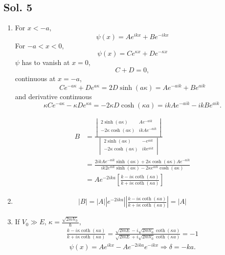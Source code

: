 \subsection*{Sol. 5}
\begin{enumerate}
    \item
          For $x<-a$,
          $$
              \psi(x) = Ae^{ik x} + Be^{-ikx}
          $$
          For $-a<x<0$,
          $$
              \psi(x) = Ce^{\kappa x}+De^{-\kappa x}
          $$
          $\psi$ has to vanish at $x=0$,
          $$
              C+D=0,
          $$
          continuous at $x=-a$,
          $$
              Ce^{-a\kappa }+De^{ a\kappa }
              =2D\sinh(a\kappa)
              =
              Ae^{-aik } + Be^{aik}
          $$
          and derivative continuous
          $$
              \kappa Ce^{-a\kappa }-\kappa De^{\kappa a}
              =-2\kappa D\cosh(\kappa a)
              =ikAe^{-aik } -ik Be^{aik}.
          $$

          \begin{align*}
              B & =\frac{\begin{vmatrix}
                           2\sinh(a\kappa)        & Ae^{-aik}   \\
                           -2\kappa\cosh(a\kappa) & ikAe^{-aik} \\
                       \end{vmatrix}}{\begin{vmatrix}
                           2\sinh(a\kappa)        & - e^{aik} \\
                           -2\kappa\cosh(a\kappa) & ike^{aik} \\
                       \end{vmatrix}} \\
                & =\frac{2ikAe^{-aik}\sinh(a\kappa)+2\kappa\cosh(a\kappa)Ae^{-aik}}
                   {ik2e^{aik}\sinh(a\kappa)-2\kappa e^{aik}\cosh(a\kappa)} \\
                & =Ae^{-2ika}
              \left[
                  \frac{k-i\kappa\coth(\kappa a)}{k+i\kappa\coth(\kappa a)}
                  \right]
          \end{align*}
    \item
          \begin{align*}
              |B| = |A| |e^{-2ika}| |\frac{k-i\kappa\coth(\kappa a)}{k+i\kappa\coth(\kappa a)}| = |A|
          \end{align*}
    \item If $V_0\gg E$, $\kappa = \frac{\sqrt{2mV_0}}{\hbar}$,
          \begin{align*}
              \frac{k-i\kappa\coth(\kappa a)}{k+i\kappa\coth(\kappa a)}
              =\frac{\sqrt{2mE}-i\sqrt{2mV_0}\coth(\kappa a)}
               {\sqrt{2mE}+i\sqrt{2mV_0}\coth(\kappa a)}
              =-1
          \end{align*}
          \begin{align*}
              \psi(x) = Ae^{ikx} - Ae^{-2ika}e^{-ikx}\Rightarrow
              \delta = -ka.
          \end{align*}
\end{enumerate}
